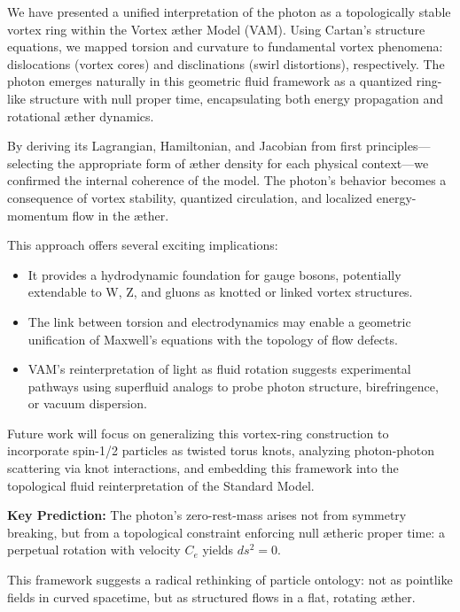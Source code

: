     We have presented a unified interpretation of the photon as a topologically stable vortex ring within the Vortex \ae ther Model (VAM). Using Cartan’s structure equations, we mapped torsion and curvature to fundamental vortex phenomena: dislocations (vortex cores) and disclinations (swirl distortions), respectively. The photon emerges naturally in this geometric fluid framework as a quantized ring-like structure with null proper time, encapsulating both energy propagation and rotational æther dynamics.


    By deriving its Lagrangian, Hamiltonian, and Jacobian from first principles—selecting the appropriate form of æther density for each physical context—we confirmed the internal coherence of the model. The photon's behavior becomes a consequence of vortex stability, quantized circulation, and localized energy-momentum flow in the æther.


    This approach offers several exciting implications:

    \begin{itemize}

    \item It provides a hydrodynamic foundation for gauge bosons, potentially extendable to W, Z, and gluons as knotted or linked vortex structures.

    \item The link between torsion and electrodynamics may enable a geometric unification of Maxwell’s equations with the topology of flow defects.

    \item VAM’s reinterpretation of light as fluid rotation suggests experimental pathways using superfluid analogs to probe photon structure, birefringence, or vacuum dispersion.

    \end{itemize}


    Future work will focus on generalizing this vortex-ring construction to incorporate spin-1/2 particles as twisted torus knots, analyzing photon-photon scattering via knot interactions, and embedding this framework into the topological fluid reinterpretation of the Standard Model.


    \medskip

    \noindent\textbf{Key Prediction:} The photon's zero-rest-mass arises not from symmetry breaking, but from a topological constraint enforcing null ætheric proper time: a perpetual rotation with velocity $C_e$ yields $ds^2 = 0$.


    \medskip

    \noindent This framework suggests a radical rethinking of particle ontology: not as pointlike fields in curved spacetime, but as structured flows in a flat, rotating æther.